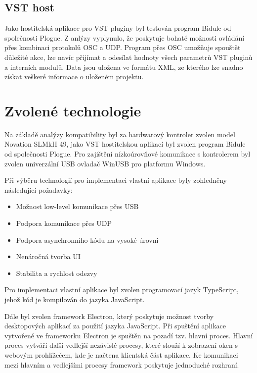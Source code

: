 \documentclass[thesis=M,czech]{FITthesis}[2019/03/06]
\begin{document}
		\subsection{VST host}
		Jako hostitelská aplikace pro VST pluginy byl testován program Bidule od společnosti Plogue.
		Z anlýzy vyplynulo, že poskytuje bohaté možnosti ovládání přes kombinaci protokolů OSC a UDP.
		Program přes OSC umožňuje spouštět důležité akce, lze navíc přijímat a odesílat hodnoty všech parametrů VST pluginů a interních modulů.
		Data jsou uložena ve formátu XML, ze kterého lze snadno získat veškeré informace o uloženém projektu.
		
	\section{Zvolené technologie}
		Na základě analýzy kompatibility byl za hardwarový kontroler zvolen model Novation SLMkII 49, jako VST hostitelskou aplikací byl zvolen program Bidule od společnosti Plogue.
		Pro zajištění nízkoúrovňové komunikace s kontrolerem byl zvolen univerzální USB ovladač WinUSB pro platformu Windows.
	
		Při výběru technologií pro implementaci vlastní aplikace byly zohledněny následující požadavky:
		\begin{itemize}
			\item Možnost low-level komunikace přes USB
			\item Podpora komunikace přes UDP
			\item Podpora asynchronního kódu na vysoké úrovni
			\item Nenáročná tvorba UI
			\item Stabilita a rychlost odezvy
		\end{itemize}
			
		Pro implementaci vlastní aplikace byl zvolen programovací jazyk TypeScript, jehož kód je kompilován do jazyka JavaScript.

		Dále byl zvolen framework Electron, který poskytuje možnost tvorby desktopových aplikací za použití jazyka JavaScript.
		Při spuštění aplikace vytvořené ve frameworku Electron je spuštěn na pozadí tzv. hlavní proces.
		Hlavní proces vytváří další vedlejší nezávislé procesy, které slouží k zobrazení oken s webovým prohlížečem, kde je načtena klientská část aplikace.
		Ke komunikaci mezi hlavním a vedlejšími procesy framework poskytuje jednoduché rozhraní.
\end{document}
